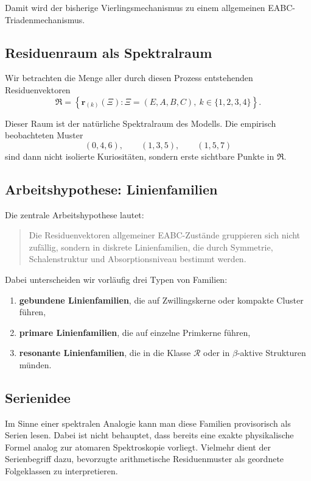 \documentclass[11pt,a4paper]{article}
\theoremstyle{definition}
\theoremstyle{plain}
\theoremstyle{remark}
\begin{document}
	Damit wird der bisherige Vierlingsmechanismus zu einem allgemeinen EABC-Triadenmechanismus.
	
	\subsection{Residuenraum als Spektralraum}
	
	Wir betrachten die Menge aller durch diesen Prozess entstehenden Residuenvektoren
	\[
	\mathfrak R
	=
	\left\{
	\mathbf r_{(k)}(\Xi):
	\Xi=(E,A,B,C),\ k\in\{1,2,3,4\}
	\right\}.
	\]
	
	Dieser Raum ist der natürliche Spektralraum des Modells. 
	Die empirisch beobachteten Muster
	\[
	(0,4,6),\qquad (1,3,5),\qquad (1,5,7)
	\]
	sind dann nicht isolierte Kuriositäten, sondern erste sichtbare Punkte in \(\mathfrak R\).
	
	\subsection{Arbeitshypothese: Linienfamilien}
	
	Die zentrale Arbeitshypothese lautet:
	
	\begin{quote}
		Die Residuenvektoren allgemeiner EABC-Zustände gruppieren sich nicht zufällig, sondern in diskrete Linienfamilien, die durch Symmetrie, Schalenstruktur und Absorptionsniveau bestimmt werden.
	\end{quote}
	
	Dabei unterscheiden wir vorläufig drei Typen von Familien:
	
	\begin{enumerate}
		\item \textbf{gebundene Linienfamilien}, die auf Zwillingskerne oder kompakte Cluster führen,
		\item \textbf{primare Linienfamilien}, die auf einzelne Primkerne führen,
		\item \textbf{resonante Linienfamilien}, die in die Klasse \(\mathcal R\) oder in \(\beta\)-aktive Strukturen münden.
	\end{enumerate}
	
	\subsection{Serienidee}
	
	Im Sinne einer spektralen Analogie kann man diese Familien provisorisch als Serien lesen. 
	Dabei ist nicht behauptet, dass bereits eine exakte physikalische Formel analog zur atomaren Spektroskopie vorliegt. 
	Vielmehr dient der Serienbegriff dazu, bevorzugte arithmetische Residuenmuster als geordnete Folgeklassen zu interpretieren.
	
\end{document}
